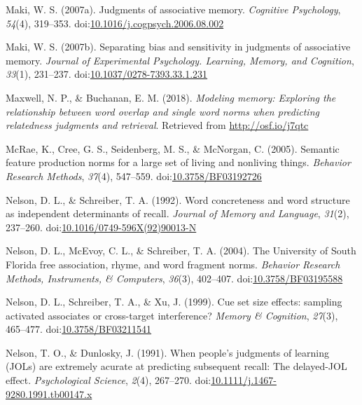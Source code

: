 \documentclass[english,man]{apa6}
\theoremstyle{definition}
\theoremstyle{definition}
\theoremstyle{definition}
\theoremstyle{remark}
\begin{document}
\hypertarget{ref-Maki2007a}{}
Maki, W. S. (2007a). Judgments of associative memory. \emph{Cognitive
Psychology}, \emph{54}(4), 319--353.
doi:\href{https://doi.org/10.1016/j.cogpsych.2006.08.002}{10.1016/j.cogpsych.2006.08.002}

\hypertarget{ref-Maki2007}{}
Maki, W. S. (2007b). Separating bias and sensitivity in judgments of
associative memory. \emph{Journal of Experimental Psychology. Learning,
Memory, and Cognition}, \emph{33}(1), 231--237.
doi:\href{https://doi.org/10.1037/0278-7393.33.1.231}{10.1037/0278-7393.33.1.231}

\hypertarget{ref-Maxwell2018}{}
Maxwell, N. P., \& Buchanan, E. M. (2018). \emph{Modeling memory:
Exploring the relationship between word overlap and single word norms
when predicting relatedness judgments and retrieval}. Retrieved from
\url{http://osf.io/j7qtc}

\hypertarget{ref-McRae2005}{}
McRae, K., Cree, G. S., Seidenberg, M. S., \& McNorgan, C. (2005).
Semantic feature production norms for a large set of living and
nonliving things. \emph{Behavior Research Methods}, \emph{37}(4),
547--559.
doi:\href{https://doi.org/10.3758/BF03192726}{10.3758/BF03192726}

\hypertarget{ref-Nelson1992}{}
Nelson, D. L., \& Schreiber, T. A. (1992). Word concreteness and word
structure as independent determinants of recall. \emph{Journal of Memory
and Language}, \emph{31}(2), 237--260.
doi:\href{https://doi.org/10.1016/0749-596X(92)90013-N}{10.1016/0749-596X(92)90013-N}

\hypertarget{ref-Nelson2004}{}
Nelson, D. L., McEvoy, C. L., \& Schreiber, T. A. (2004). The University
of South Florida free association, rhyme, and word fragment norms.
\emph{Behavior Research Methods, Instruments, \& Computers},
\emph{36}(3), 402--407.
doi:\href{https://doi.org/10.3758/BF03195588}{10.3758/BF03195588}

\hypertarget{ref-Nelson1999}{}
Nelson, D. L., Schreiber, T. A., \& Xu, J. (1999). Cue set size effects:
sampling activated associates or cross-target interference? \emph{Memory
\& Cognition}, \emph{27}(3), 465--477.
doi:\href{https://doi.org/10.3758/BF03211541}{10.3758/BF03211541}

\hypertarget{ref-Nelson1991}{}
Nelson, T. O., \& Dunlosky, J. (1991). When people's judgments of
learning (JOLs) are extremely acurate at predicting subsequent recall:
The delayed-JOL effect. \emph{Psychological Science}, \emph{2}(4),
267--270.
doi:\href{https://doi.org/10.1111/j.1467-9280.1991.tb00147.x}{10.1111/j.1467-9280.1991.tb00147.x}
\end{document}
